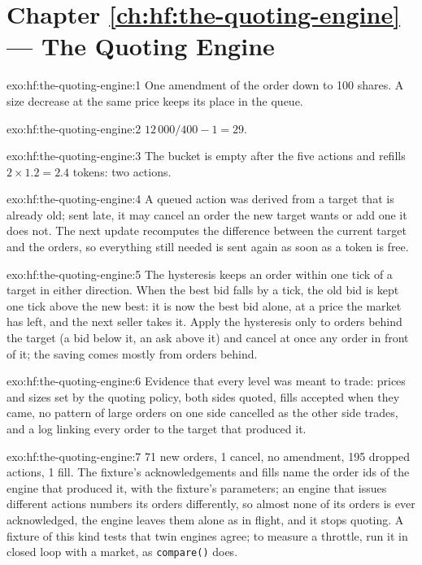 \section*{Chapter \ref{ch:hf:the-quoting-engine} --- The Quoting Engine}

\begin{solution}{exo:hf:the-quoting-engine:1}
One amendment of the order down to 100 shares. A size decrease at the same price keeps its place in the queue.
\end{solution}

\begin{solution}{exo:hf:the-quoting-engine:2}
$12\,000/400-1=29$.
\end{solution}

\begin{solution}{exo:hf:the-quoting-engine:3}
The bucket is empty after the five actions and refills $2\times1.2=2.4$ tokens: two actions.
\end{solution}

\begin{solution}{exo:hf:the-quoting-engine:4}
A queued action was derived from a target that is already old; sent late, it may cancel an order the new target wants or add one it does not. The
next update recomputes the difference between the current target and the orders, so everything still needed is sent again as soon as a token is
free.
\end{solution}

\begin{solution}{exo:hf:the-quoting-engine:5}
The hysteresis keeps an order within one tick of a target in either direction. When the best bid falls by a tick, the old bid is kept one tick above
the new best: it is now the best bid alone, at a price the market has left, and the next seller takes it. Apply the hysteresis only to orders
behind the target (a bid below it, an ask above it) and cancel at once any order in front of it; the saving comes mostly from orders behind.
\end{solution}

\begin{solution}{exo:hf:the-quoting-engine:6}
Evidence that every level was meant to trade: prices and sizes set by the quoting policy, both sides quoted, fills accepted when they came, no pattern
of large orders on one side cancelled as the other side trades, and a log linking every order to the target that produced it.
\end{solution}

\begin{solution}{exo:hf:the-quoting-engine:7}
71 new orders, 1 cancel, no amendment, 195 dropped actions, 1 fill. The fixture's acknowledgements and fills name the order ids of the engine that
produced it, with the fixture's parameters; an engine that issues different actions numbers its orders differently, so almost none of its orders is
ever acknowledged, the engine leaves them alone as in flight, and it stops quoting. A fixture of this kind tests that twin engines agree; to measure a
throttle, run it in closed loop with a market, as \texttt{compare()} does.
\end{solution}

